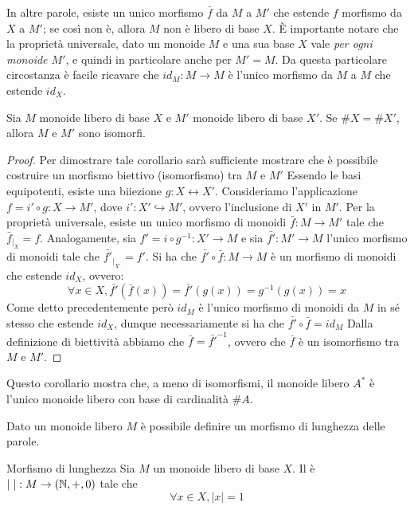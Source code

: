 In altre parole, esiste un unico morfismo \(\bar{f}\) da \(M\) a \(M'\) che estende \(f\) morfismo da \(X\) a \(M'\); se così non è, allora \(M\) non è libero di base \(X\).
È importante notare che la proprietà universale, dato un monoide \(M\) e una sua base \(X\) vale \emph{per ogni monoide \(M'\)}, e quindi in particolare anche per \(M' = M\).
Da questa particolare circostanza è facile ricavare che \(id_M: M \to M\) è l'unico morfismo da \(M\) a \(M\) che estende \(id_X\).

\begin{corollary}{}
  Sia \(M\) monoide libero di base \(X\) e \(M'\) monoide libero di base \(X'\).
  Se \(\#X = \#X'\), allora \(M\) e \(M'\) sono isomorfi.
\end{corollary}

\begin{proof}
  Per dimostrare tale corollario sarà sufficiente mostrare che è possibile costruire un morfismo biettivo (isomorfismo) tra \(M\) e \(M'\)
  Essendo le basi equipotenti, esiste una biiezione \(g: X \leftrightarrow X'\).
  Consideriamo l'applicazione \(f = i' \circ g : X \to M'\), dove \(i': X' \hookrightarrow M'\), ovvero l'inclusione di \(X'\) in \(M'\).
  Per la proprietà universale, esiste un unico morfismo di monoidi \(\bar{f}: M \to M'\) tale che \(\bar{f}_{|_X} = f\).
  Analogamente, sia \(f'= i \circ g^{-1} : X' \to M\) e sia \(\bar{f'}: M' \to M\) l'unico morfismo di monoidi tale che \(\bar{f'}_{|_{X'}} = f'\).
  Si ha che \(\bar{f'} \circ \bar{f}: M \to M\) è un morfismo di monoidi che estende \(id_X\), ovvero:
  \[\forall x \in X, \bar{f'} (\bar{f}(x)) = \bar{f'}(g(x))= g^{-1}(g(x))= x\]
  Come detto precedentemente però \(id_M\) è l'unico morfismo di monoidi da \(M\) in sé stesso che estende \(id_X\), dunque necessariamente si ha che \(\bar{f'} \circ \bar{f} = id_M\)
  Dalla definizione di biettività abbiamo che \(\bar{f} = \bar{f'}^{-1} \), ovvero che \(\bar{f}\) è un isomorfismo tra \(M\) e \(M'\). 
\end{proof}
Questo corollario mostra che, a meno di isomorfismi, il monoide libero \(A^*\) è l'unico monoide libero con base di cardinalità \(\#A\).

Dato un monoide libero \(M\) è possibile definire un morfismo di lunghezza delle parole.
\begin{definition}{Morfismo di lunghezza}
  Sia \(M\) un monoide libero di base \(X\).
  Il  è \(|\;|: M \to(\mathbb{N},+,0)\) tale che \[\forall x \in X, |x| = 1\]
\end{definition}

